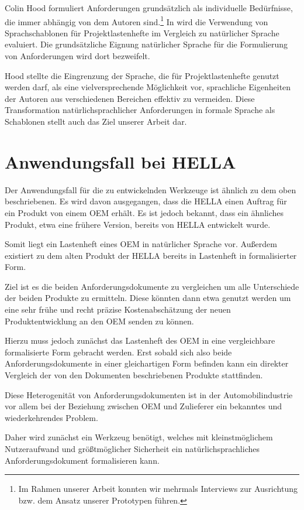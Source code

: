 \documentclass[12pt]{report}
\begin{document}
Colin Hood formuliert Anforderungen grundsätzlich als \glqq individuelle Bedürfnisse\grqq{}, die immer abhängig von dem Autoren sind.\footnote{Im Rahmen unserer Arbeit konnten wir mehrmals Interviews zur Ausrichtung bzw. dem Ansatz unserer Prototypen führen.} In wird die Verwendung von Sprachschablonen für Projektlastenhefte im Vergleich zu natürlicher Sprache evaluiert. Die grundsätzliche Eignung natürlicher Sprache für die Formulierung von Anforderungen wird dort bezweifelt. 

Hood stellte die Eingrenzung der Sprache, die für Projektlastenhefte genutzt werden darf, als eine vielversprechende Möglichkeit vor, sprachliche Eigenheiten der Autoren aus verschiedenen Bereichen effektiv zu vermeiden. Diese Transformation natürlichsprachlicher Anforderungen in formale Sprache als Schablonen stellt auch das Ziel unserer Arbeit dar.

\section{Anwendungsfall bei HELLA} 

Der Anwendungsfall für die zu entwickelnden Werkzeuge ist ähnlich zu dem oben beschriebenen. Es wird davon ausgegangen, dass die HELLA einen Auftrag für ein Produkt von einem OEM erhält. Es ist jedoch bekannt, dass ein ähnliches Produkt, etwa eine frühere Version, bereits von HELLA entwickelt wurde.

Somit liegt ein Lastenheft eines OEM in natürlicher Sprache vor. Außerdem existiert zu dem alten Produkt der HELLA bereits in Lastenheft in formalisierter Form.

Ziel ist es die beiden Anforderungsdokumente zu vergleichen um alle Unterschiede der beiden Produkte zu ermitteln. Diese könnten dann etwa genutzt werden um eine sehr frühe und recht präzise Kostenabschätzung der neuen Produktentwicklung an den OEM senden zu können. 

Hierzu muss jedoch zunächst das Lastenheft des OEM in eine vergleichbare formalisierte Form gebracht werden. Erst sobald sich also beide Anforderungsdokumente in einer gleichartigen Form befinden kann ein direkter Vergleich der von den Dokumenten beschriebenen Produkte stattfinden. 

Diese Heterogenität von Anforderungsdokumenten ist in der Automobilindustrie vor allem bei der Beziehung zwischen OEM und Zulieferer ein bekanntes und wiederkehrendes Problem.

Daher wird zunächst ein Werkzeug benötigt, welches mit kleinstmöglichem Nutzeraufwand und größtmöglicher Sicherheit ein natürlichsprachliches Anforderungsdokument formalisieren kann. 
\end{document}
